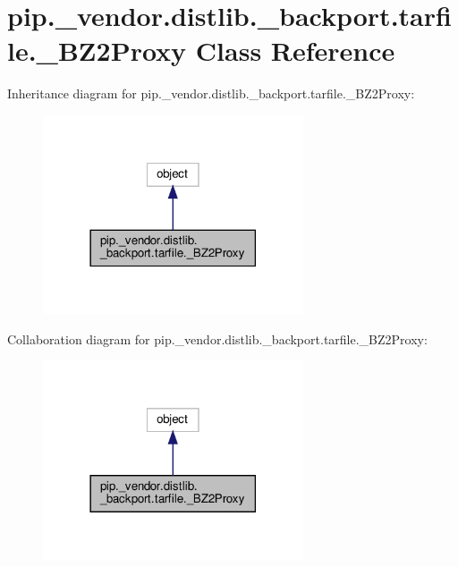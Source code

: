 \hypertarget{classpip_1_1__vendor_1_1distlib_1_1__backport_1_1tarfile_1_1__BZ2Proxy}{}\section{pip.\+\_\+vendor.\+distlib.\+\_\+backport.\+tarfile.\+\_\+\+B\+Z2\+Proxy Class Reference}
\label{classpip_1_1__vendor_1_1distlib_1_1__backport_1_1tarfile_1_1__BZ2Proxy}


Inheritance diagram for pip.\+\_\+vendor.\+distlib.\+\_\+backport.\+tarfile.\+\_\+\+B\+Z2\+Proxy\+:
\nopagebreak
\begin{figure}[H]
\begin{center}
\leavevmode
\includegraphics[width=218pt]{classpip_1_1__vendor_1_1distlib_1_1__backport_1_1tarfile_1_1__BZ2Proxy__inherit__graph}
\end{center}
\end{figure}


Collaboration diagram for pip.\+\_\+vendor.\+distlib.\+\_\+backport.\+tarfile.\+\_\+\+B\+Z2\+Proxy\+:
\nopagebreak
\begin{figure}[H]
\begin{center}
\leavevmode
\includegraphics[width=218pt]{classpip_1_1__vendor_1_1distlib_1_1__backport_1_1tarfile_1_1__BZ2Proxy__coll__graph}
\end{center}
\end{figure}
